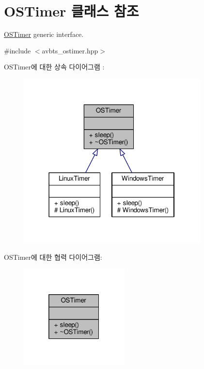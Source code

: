 \hypertarget{class_o_s_timer}{}\section{O\+S\+Timer 클래스 참조}
\label{class_o_s_timer}


\hyperlink{class_o_s_timer}{O\+S\+Timer} generic interface.  




{\ttfamily \#include $<$avbts\+\_\+ostimer.\+hpp$>$}



O\+S\+Timer에 대한 상속 다이어그램 \+: 
\nopagebreak
\begin{figure}[H]
\begin{center}
\leavevmode
\includegraphics[width=274pt]{class_o_s_timer__inherit__graph}
\end{center}
\end{figure}


O\+S\+Timer에 대한 협력 다이어그램\+:
\nopagebreak
\begin{figure}[H]
\begin{center}
\leavevmode
\includegraphics[width=157pt]{class_o_s_timer__coll__graph}
\end{center}
\end{figure}
